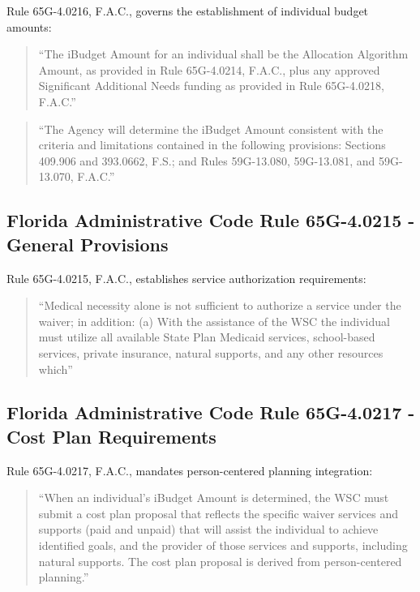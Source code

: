 Rule 65G-4.0216, F.A.C., governs the establishment of individual budget amounts:

\begin{quote}
``The iBudget Amount for an individual shall be the Allocation Algorithm Amount, as provided in Rule 65G-4.0214, F.A.C., plus any approved Significant Additional Needs funding as provided in Rule 65G-4.0218, F.A.C.''
\end{quote}

\begin{quote}
``The Agency will determine the iBudget Amount consistent with the criteria and limitations contained in the following provisions: Sections 409.906 and 393.0662, F.S.; and Rules 59G-13.080, 59G-13.081, and 59G-13.070, F.A.C.''
\end{quote}

\subsection{Florida Administrative Code Rule 65G-4.0215 - General Provisions}

Rule 65G-4.0215, F.A.C., establishes service authorization requirements:

\begin{quote}
``Medical necessity alone is not sufficient to authorize a service under the waiver; in addition: (a) With the assistance of the WSC the individual must utilize all available State Plan Medicaid services, school-based services, private insurance, natural supports, and any other resources which''
\end{quote}

\subsection{Florida Administrative Code Rule 65G-4.0217 - Cost Plan Requirements}

Rule 65G-4.0217, F.A.C., mandates person-centered planning integration:

\begin{quote}
``When an individual's iBudget Amount is determined, the WSC must submit a cost plan proposal that reflects the specific waiver services and supports (paid and unpaid) that will assist the individual to achieve identified goals, and the provider of those services and supports, including natural supports. The cost plan proposal is derived from person-centered planning.''
\end{quote}

